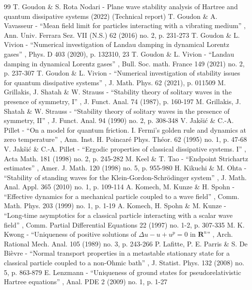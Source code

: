 \documentclass[11pt]{article}
\theoremstyle{definition}
\begin{document}
\begin{thebibliography}{99}
 T. Goudon \& S. Rota Nodari - Plane wave stability analysis of Hartree and quantum dissipative systems (2022) (Technical report)
 T. Goudon \& A. Vavasseur - “Mean field limit for particles interacting with a vibrating medium” , Ann. Univ. Ferrara Sez. VII (N.S.) 62 (2016) no. 2, p. 231-273
 T. Goudon \& L. Vivion - “Numerical investigation of Landau damping in dynamical Lorentz gases” , Phys. D 403 (2020), p. 132310, 23
 T. Goudon \& L. Vivion - “Landau damping in dynamical Lorentz gases” , Bull. Soc. math. France 149 (2021) no. 2, p. 237-307
 T. Goudon \& L. Vivion - “Numerical investigation of stability issues for quantum dissipative systems” , J. Math. Phys. 62 (2021), p. 011509
 M. Grillakis, J. Shatah \& W. Strauss - “Stability theory of solitary waves in the presence of symmetry, I” , J. Funct. Anal. 74 (1987), p. 160-197
 M. Grillakis, J. Shatah \& W. Strauss - “Stability theory of solitary waves in the presence of symmetry, II” , J. Funct. Anal. 94 (1990) no. 2, p. 308-348
 V. Jakšić \& C.-A. Pillet - “On a model for quantum friction. I. Fermi’s golden rule and dynamics at zero temperature” , Ann. Inst. H. Poincaré Phys. Théor. 62 (1995) no. 1, p. 47-68
 V. Jakšić \& C.-A. Pillet - “Ergodic properties of classical dissipative systems. I” , Acta Math. 181 (1998) no. 2, p. 245-282
 M. Keel \& T. Tao - “Endpoint Strichartz estimates” , Amer. J. Math. 120 (1998) no. 5, p. 955-980
 H. Kikuchi \& M. Ohta - “Stability of standing waves for the Klein-Gordon-Schrödinger system” , J. Math. Anal. Appl. 365 (2010) no. 1, p. 109-114
 A. Komech, M. Kunze \& H. Spohn - “Effective dynamics for a mechanical particle coupled to a wave field” , Comm. Math. Phys. 203 (1999) no. 1, p. 1-19
 A. Komech, H. Spohn \& M. Kunze - “Long-time asymptotics for a classical particle interacting with a scalar wave field” , Comm. Partial Differential Equations 22 (1997) no. 1-2, p. 307-335
 M. K. Kwong - “Uniqueness of positive solutions of $\Delta u-u+u^p=0$ in ${\mathbf{R}}^n$” , Arch. Rational Mech. Anal. 105 (1989) no. 3, p. 243-266
 P. Lafitte, P. E. Parris \& S. De Bièvre - “Normal transport properties in a metastable stationary state for a classical particle coupled to a non-Ohmic bath” , J. Statist. Phys. 132 (2008) no. 5, p. 863-879
 E. Lenzmann - “Uniqueness of ground states for pseudorelativistic Hartree equations” , Anal. PDE 2 (2009) no. 1, p. 1-27

\end{thebibliography}
\end{document}
